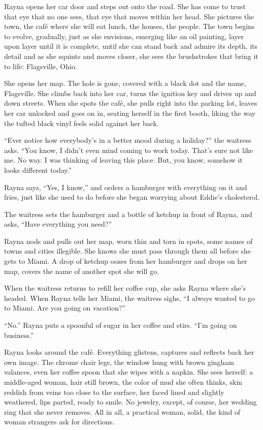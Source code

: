 \documentclass[
]{article}
\begin{document}
Rayna opens her car door and steps out onto the road. She has come to
trust that eye that no one sees, that eye that moves within her head.
She pictures the town, the café where she will eat lunch, the houses,
the people. The town begins to evolve, gradually, just as she envisions,
emerging like an oil painting, layer upon layer until it is complete,
until she can stand back and admire its depth, its detail and as she
squints and moves closer, she sees the brushstrokes that bring it to
life: Flagsville, Ohio.

She opens her map. The hole is gone, covered with a black dot and the
name, Flagsville. She climbs back into her car, turns the ignition key
and drives up and down streets. When she spots the café, she pulls right
into the parking lot, leaves her car unlocked and goes on in, seating
herself in the first booth, liking the way the tufted black vinyl feels
solid against her back.

``Ever notice how everybody's in a better mood during a holiday?'' the
waitress asks. ``You know, I didn't even mind coming to work today.
That's sure not like me. No way. I was thinking of leaving this place.
But, you know, somehow it looks different today.''

Rayna says, ``Yes, I know,'' and orders a hamburger with everything on
it and fries, just like she used to do before she began worrying about
Eddie's cholesterol.

The waitress sets the hamburger and a bottle of ketchup in front of
Rayna, and asks, ``Have everything you need?''

Rayna nods and pulls out her map, worn thin and torn in spots, some
names of towns and cit­ies illegible. She knows she must pass through
them all before she gets to Miami. A drop of ketchup oozes from her
hamburger and drops on her map, covers the name of another spot she will
go.

When the waitress returns to refill her coffee cup, she asks Rayna where
she's headed. When Rayna tells her Miami, the waitress sighs, ``I always
wanted to go to Miami. Are you going on vacation?''

``No.'' Rayna puts a spoonful of sugar in her coffee and stirs. ``I'm
going on business.''

Rayna looks around the café. Everything glistens, captures and reflects
back her own image. The chrome chair legs, the window hung with brown
gingham valances, even her coffee spoon that she wipes with a napkin.
She sees herself: a middle-aged woman, hair still brown, the color of
mud she often thinks, skin reddish from veins too close to the surface,
her faced lined and slightly weathered, lips parted, ready to smile. No
jewelry, except, of course, her wedding ring that she never removes. All
in all, a practical woman, solid, the kind of woman strangers ask for
directions.
\end{document}

